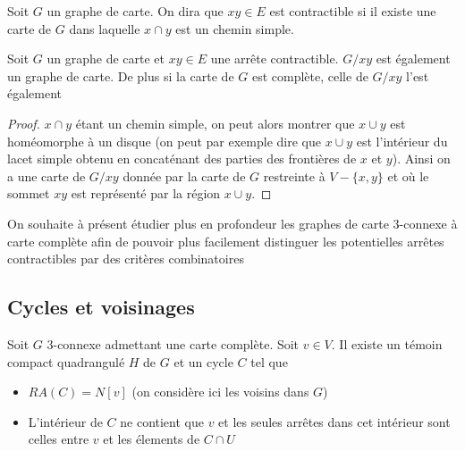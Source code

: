 \documentclass{scrartcl}
\begin{document}
\begin{flushleft}
\begin{def*}
    Soit $G$ un graphe de carte. On dira que $xy \in E$ est contractible si il existe une carte de $G$ dans laquelle
    $x \cap y$ est un chemin simple.
\end{def*}

\begin{prop}
    Soit $G$ un graphe de carte et $xy \in E$ une arrête contractible. $G / xy$ est également un graphe de carte.
    De plus si la carte de $G$ est complète, celle de $G / xy$ l'est également
\end{prop}

\begin{proof}
    $x \cap y$ étant un chemin simple, on peut alors montrer que $x \cup y$ est homéomorphe à un disque (on peut par
    exemple dire que $x \cup y$ est l'intérieur du lacet simple obtenu en concaténant des parties des frontières de $x$ et $y$).
    Ainsi on a une carte de $G / xy$ donnée par la carte de $G$ restreinte à $V - \{x,y\}$ et où le sommet $xy$ est représenté
    par la région $x \cup y$.
\end{proof}

On souhaite à présent étudier plus en profondeur les graphes de carte $3$-connexe à carte complète afin de pouvoir plus facilement
distinguer les potentielles arrêtes contractibles par des critères combinatoires

\subsection{Cycles et voisinages}

\begin{prop}\label{cyclSep}
    Soit $G$ $3$-connexe admettant une carte complète. Soit $v \in V$. Il existe un témoin compact quadrangulé $H$ de $G$ et
    un cycle $C$ tel que
    \begin{itemize}
        \item $RA(C) = N[v]$ (on considère ici les voisins dans $G$)
        \item L'intérieur de $C$ ne contient que $v$ et les seules arrêtes dans cet intérieur sont celles entre $v$ et
        les élements de $C \cap U$
    \end{itemize}
\end{prop}


\end{flushleft}
\end{document}
